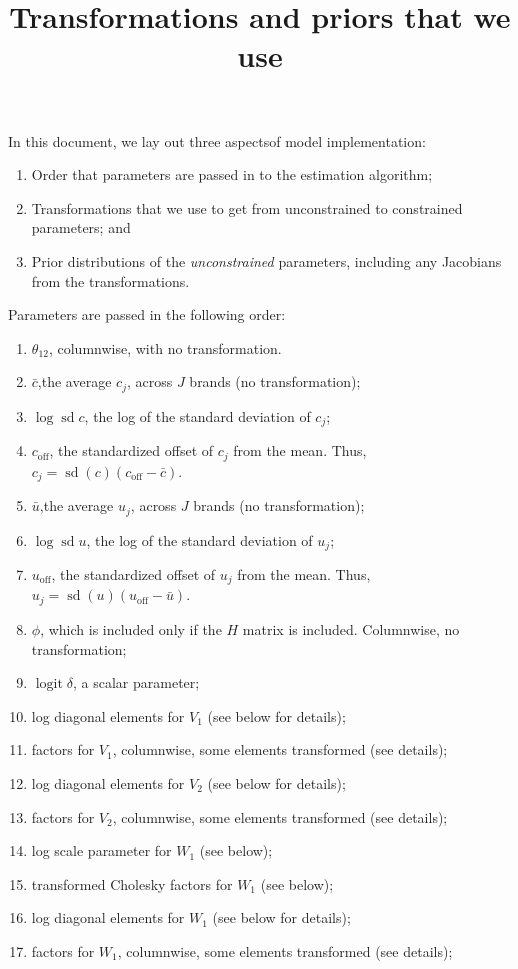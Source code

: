 \documentclass[letter,11pt]{article}
\title{Transformations and priors that we use}
\DeclareMathOperator\sd{sd}
\DeclareMathOperator\logit{logit}
\newcommand{\off}{\text{off}}
\begin{document}
\maketitle

In this document, we lay out three aspectsof model implementation:
\begin{enumerate}
\item Order that parameters are passed in to the estimation algorithm;
\item Transformations that we use to get from unconstrained to
  constrained parameters; and
\item Prior distributions of the \emph{unconstrained} parameters,
  including any Jacobians from the transformations.
\end{enumerate}

Parameters are passed in the following order:
\begin{enumerate}
\item $\theta_{12}$, columnwise, with no transformation.
\item $\bar{c}$,the average $c_j$, across $J$ brands (no transformation);
\item $\log\sd c$, the log of the standard deviation of $c_j$;
\item $c_{\off}$, the standardized offset of $c_j$ from the mean. Thus,
  $c_j=\sd(c)\left(c_{\off}-\bar{c}\right)$.
\item $\bar{u}$,the average $u_j$, across $J$ brands (no transformation);
\item $\log\sd u$, the log of the standard deviation of $u_j$;
\item $u_{\off}$, the standardized offset of $u_j$ from the mean.
  Thus,  $u_j=\sd(u)\left(u_{\off}-\bar{u}\right)$.
\item $\phi$, which is included only if the $H$ matrix is included.
  Columnwise, no transformation;
\item $\logit\delta$, a scalar parameter;
\item log diagonal elements for $V_1$ (see below for details);
\item factors for $V_1$, columnwise, some elements transformed (see
  details);
\item log diagonal elements for $V_2$ (see below for details);
\item factors for $V_2$, columnwise, some elements transformed (see
  details);
\item log scale parameter for $W_1$ (see below);
\item transformed Cholesky factors for $W_1$ (see below);
\item log diagonal elements for $W_1$ (see below for details);
\item factors for $W_1$, columnwise, some elements transformed (see
  details);
\end{enumerate}
\end{document}
